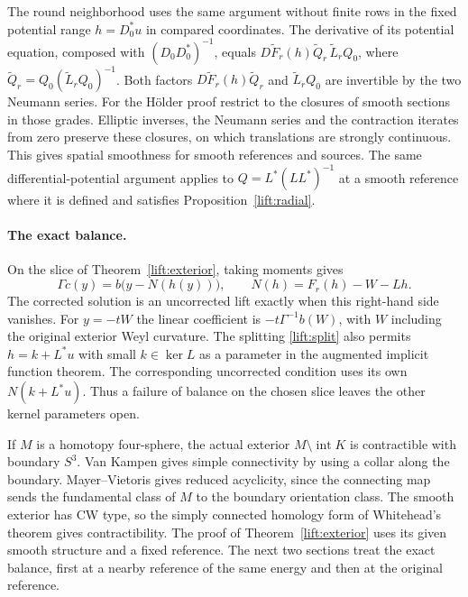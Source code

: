\documentclass[11pt]{article}
\numberwithin{equation}{section}
\theoremstyle{definition}
\theoremstyle{remark}
\begin{document}
The round neighborhood uses the same argument without finite rows
in the fixed potential range \(h=D_0^*u\) in compared coordinates.
The derivative of its potential equation, composed with
\((D_0D_0^*)^{-1}\), equals
\(D\widetilde F_r(h)\widetilde Q_r\,\widetilde L_rQ_0\), where
\(\widetilde Q_r=Q_0(\widetilde L_rQ_0)^{-1}\). Both factors
\(D\widetilde F_r(h)\widetilde Q_r\) and \(\widetilde L_rQ_0\)
are invertible by the two Neumann series.
For the H\"older proof restrict to the closures of smooth sections
in those grades. Elliptic inverses, the Neumann series and the
contraction iterates from zero preserve these closures, on which
translations are strongly continuous. This gives spatial smoothness
for smooth references and sources. The same differential-potential
argument applies to \(Q=L^*(LL^*)^{-1}\) at a smooth reference
where it is defined and satisfies Proposition~\ref{lift:radial}.

\paragraph{The exact balance.}
On the slice of Theorem~\ref{lift:exterior}, taking moments gives
\begin{equation}\label{lift:balance}
 \Gamma c(y)=b\bigl(y-N(h(y))\bigr),\qquad
 N(h)=F_r(h)-W-Lh .
\end{equation}
The corrected solution is an uncorrected lift exactly when this
right-hand side vanishes. For \(y=-tW\) the linear coefficient is
\(-t\Gamma^{-1}b(W)\), with \(W\) including the original exterior
Weyl curvature. The splitting \eqref{lift:split} also permits
\(h=k+L^*u\) with small \(k\in\ker L\) as a parameter in the augmented
implicit function theorem. The corresponding uncorrected condition
uses its own \(N(k+L^*u)\). Thus a failure of balance on the chosen
slice leaves the other kernel parameters open.

If \(M\) is a homotopy four-sphere, the actual exterior
\(M\setminus\operatorname{int}K\) is contractible with boundary \(S^3\).
Van Kampen gives simple connectivity by using a collar along the
boundary. Mayer--Vietoris gives reduced acyclicity, since the
connecting map sends the fundamental class of \(M\) to the
boundary orientation class. The smooth exterior has CW type,
so the simply connected homology form of Whitehead's theorem
gives contractibility. The proof of Theorem~\ref{lift:exterior}
uses its given smooth structure and a fixed reference. The next two sections treat the exact balance, first at a nearby
reference of the same energy and then at the original reference.
\end{document}

